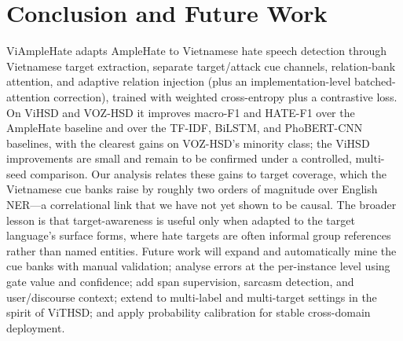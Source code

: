 \documentclass[11pt]{article}
\begin{document}
\section{Conclusion and Future Work}
ViAmpleHate adapts AmpleHate to Vietnamese hate speech detection through Vietnamese target extraction, separate target/attack cue channels, relation-bank attention, and adaptive relation injection (plus an implementation-level batched-attention correction), trained with weighted cross-entropy plus a contrastive loss. On ViHSD and VOZ-HSD it improves macro-F1 and HATE-F1 over the AmpleHate baseline and over the TF-IDF, BiLSTM, and PhoBERT-CNN baselines, with the clearest gains on VOZ-HSD's minority class; the ViHSD improvements are small and remain to be confirmed under a controlled, multi-seed comparison. Our analysis relates these gains to target coverage, which the Vietnamese cue banks raise by roughly two orders of magnitude over English NER---a correlational link that we have not yet shown to be causal. The broader lesson is that target-awareness is useful only when adapted to the target language's surface forms, where hate targets are often informal group references rather than named entities. Future work will expand and automatically mine the cue banks with manual validation; analyse errors at the per-instance level using gate value and confidence; add span supervision, sarcasm detection, and user/discourse context; extend to multi-label and multi-target settings in the spirit of ViTHSD; and apply probability calibration for stable cross-domain deployment.




\appendix
\end{document}
